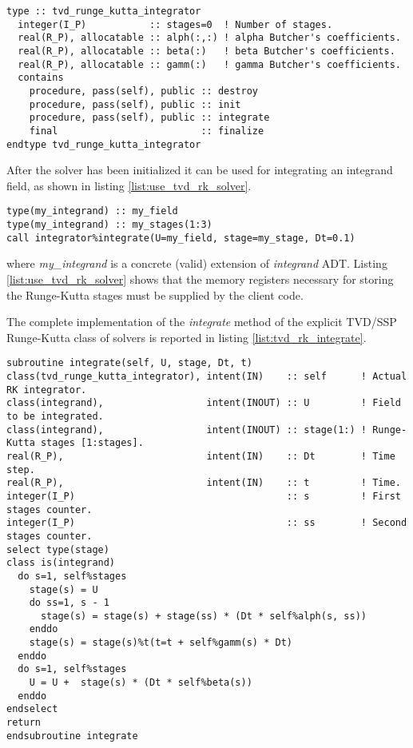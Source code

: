 \begin{lstlisting}[firstnumber=1,style=code,caption={definition of \emph{tvd\_runge\_kutta\_integrator} type},label={list:tvd_rk_solver}]
type :: tvd_runge_kutta_integrator
  integer(I_P)           :: stages=0  ! Number of stages.
  real(R_P), allocatable :: alph(:,:) ! alpha Butcher's coefficients.
  real(R_P), allocatable :: beta(:)   ! beta Butcher's coefficients.
  real(R_P), allocatable :: gamm(:)   ! gamma Butcher's coefficients.
  contains
    procedure, pass(self), public :: destroy
    procedure, pass(self), public :: init
    procedure, pass(self), public :: integrate
    final                         :: finalize
endtype tvd_runge_kutta_integrator
\end{lstlisting}

After the solver has been initialized it can be used for integrating an integrand field, as shown in listing \ref{list:use_tvd_rk_solver}.

\begin{lstlisting}[firstnumber=1,style=code,caption={example of usage of a TVD/SSP Runge-Kutta integrator},label={list:use_tvd_rk_solver}]
type(my_integrand) :: my_field
type(my_integrand) :: my_stages(1:3)
call integrator%integrate(U=my_field, stage=my_stage, Dt=0.1)
\end{lstlisting}
where \emph{my\_integrand} is a concrete (valid) extension of \emph{integrand} ADT. Listing \ref{list:use_tvd_rk_solver} shows that the memory registers necessary for storing the Runge-Kutta stages must be supplied by the client code.

The complete implementation of the \emph{integrate} method of the explicit TVD/SSP Runge-Kutta class of solvers is reported in listing \ref{list:tvd_rk_integrate}.

\begin{lstlisting}[firstnumber=1,style=code,caption={implementation of the \emph{integrate} method of explicit TVD/SSP Runge-Kutta class},label={list:tvd_rk_integrate}]
subroutine integrate(self, U, stage, Dt, t)
class(tvd_runge_kutta_integrator), intent(IN)    :: self      ! Actual RK integrator.
class(integrand),                  intent(INOUT) :: U         ! Field to be integrated.
class(integrand),                  intent(INOUT) :: stage(1:) ! Runge-Kutta stages [1:stages].
real(R_P),                         intent(IN)    :: Dt        ! Time step.
real(R_P),                         intent(IN)    :: t         ! Time.
integer(I_P)                                     :: s         ! First stages counter.
integer(I_P)                                     :: ss        ! Second stages counter.
select type(stage)
class is(integrand)
  do s=1, self%stages
    stage(s) = U
    do ss=1, s - 1
      stage(s) = stage(s) + stage(ss) * (Dt * self%alph(s, ss))
    enddo
    stage(s) = stage(s)%t(t=t + self%gamm(s) * Dt)
  enddo
  do s=1, self%stages
    U = U +  stage(s) * (Dt * self%beta(s))
  enddo
endselect
return
endsubroutine integrate
\end{lstlisting}

